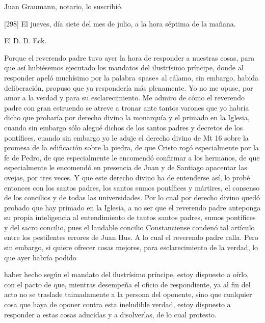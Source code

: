 Juan Graumann, notario, lo suscribió.

[298] El jueves, día siete del mes de julio, a la hora séptima de la mañana.

El D. D. Eck.

Porque el reverendo padre tuvo ayer la hora de responder a nuestras cosas, para que así hubiésemos ejecutado los mandatos del ilustrísimo príncipe, donde al responder apeló muchísimo por la palabra «pase» al cálamo, sin embargo, habida deliberación, propuso que ya respondería más plenamente. Yo no me opuse, por amor a la verdad y para su esclarecimiento. Me admiro de cómo el reverendo padre con gran estruendo se atreve a tronar ante tantos varones que yo habría dicho que probaría por derecho divino la monarquía y el primado en la Iglesia, cuando sin embargo sólo alegué dichos de los santos padres y decretos de los pontífices, cuando sin embargo yo le aduje el derecho divino de Mt 16 sobre la promesa de la edificación sobre la piedra, de que Cristo rogó especialmente por la fe de Pedro, de que especialmente le encomendó confirmar a los hermanos, de que especialmente le encomendó en presencia de Juan y de Santiago apacentar las ovejas, por tres veces. Y que este derecho divino ha de entenderse así, lo probé entonces con los santos padres, los santos sumos pontífices y mártires, el consenso de los concilios y de todas las universidades. Por lo cual por derecho divino quedó probado que hay primado en la Iglesia, a no ser que el reverendo padre anteponga su propia inteligencia al entendimiento de tantos santos padres, sumos pontífices y del sacro concilio, pues el laudable concilio Constanciense condenó tal artículo entre los pestilentes errores de Juan Hus. A lo cual el reverendo padre calla. Pero sin embargo, si quiere ofrecer cosas mejores, para esclarecimiento de la verdad, lo que ayer habría podido

haber hecho según el mandato del ilustrísimo príncipe, estoy dispuesto a oírlo, con el pacto de que, mientras desempeña el oficio de respondiente, ya al fin del acto no se traslade taimadamente a la persona del oponente, sino que cualquier cosa que haya de oponer contra esta ineludible verdad, estoy dispuesto a responder a estas cosas aducidas y a disolverlas, de lo cual protesto.

